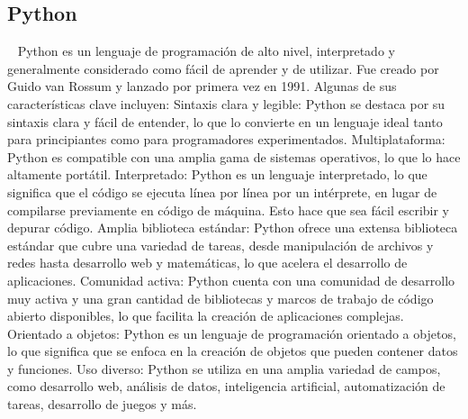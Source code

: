 \subsection{Python} ~\cite{lutz2001programming}
Python es un lenguaje de programación de alto nivel, interpretado y generalmente considerado como fácil de aprender y de utilizar. Fue creado por Guido van Rossum y lanzado por primera vez en 1991. Algunas de sus características clave incluyen:
Sintaxis clara y legible: Python se destaca por su sintaxis clara y fácil de entender, lo que lo convierte en un lenguaje ideal tanto para principiantes como para programadores experimentados.
Multiplataforma: Python es compatible con una amplia gama de sistemas operativos, lo que lo hace altamente portátil.
Interpretado: Python es un lenguaje interpretado, lo que significa que el código se ejecuta línea por línea por un intérprete, en lugar de compilarse previamente en código de máquina. Esto hace que sea fácil escribir y depurar código.
Amplia biblioteca estándar: Python ofrece una extensa biblioteca estándar que cubre una variedad de tareas, desde manipulación de archivos y redes hasta desarrollo web y matemáticas, lo que acelera el desarrollo de aplicaciones.
Comunidad activa: Python cuenta con una comunidad de desarrollo muy activa y una gran cantidad de bibliotecas y marcos de trabajo de código abierto disponibles, lo que facilita la creación de aplicaciones complejas.
Orientado a objetos: Python es un lenguaje de programación orientado a objetos, lo que significa que se enfoca en la creación de objetos que pueden contener datos y funciones.
Uso diverso: Python se utiliza en una amplia variedad de campos, como desarrollo web, análisis de datos, inteligencia artificial, automatización de tareas, desarrollo de juegos y más.

